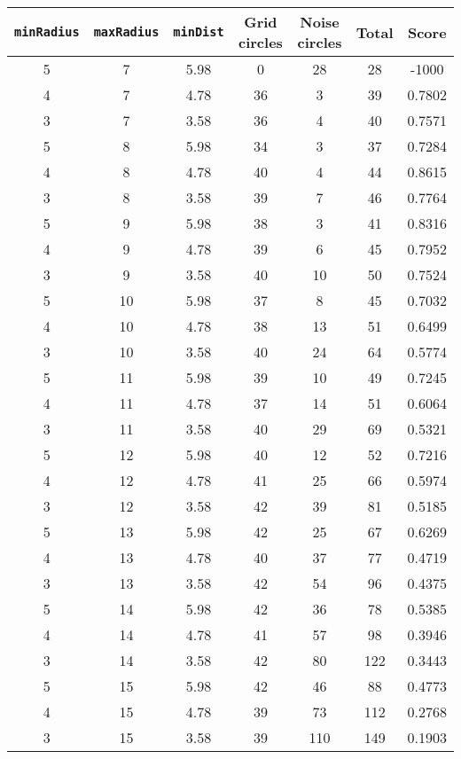 \documentclass[letterpaper, 12pt]{article}
\begin{document}
\begin{longtable}{|c|c|c|c|c|c|c|}
\hline
\textbf{\texttt{minRadius}} & \textbf{\texttt{maxRadius}} & \textbf{\texttt{minDist}} & \textbf{Grid circles} & \textbf{Noise circles} & \textbf{Total} & \textbf{Score} \\
\hline
5 & 7 & 5.98 & 0 & 28 & 28 & -1000 \\
\hline
4 & 7 & 4.78 & 36 & 3 & 39 & 0.7802 \\
\hline
3 & 7 & 3.58 & 36 & 4 & 40 & 0.7571 \\
\hline
5 & 8 & 5.98 & 34 & 3 & 37 & 0.7284 \\
\hline
4 & 8 & 4.78 & 40 & 4 & 44 & 0.8615 \\
\hline
3 & 8 & 3.58 & 39 & 7 & 46 & 0.7764 \\
\hline
5 & 9 & 5.98 & 38 & 3 & 41 & 0.8316 \\
\hline
4 & 9 & 4.78 & 39 & 6 & 45 & 0.7952 \\
\hline
3 & 9 & 3.58 & 40 & 10 & 50 & 0.7524 \\
\hline
5 & 10 & 5.98 & 37 & 8 & 45 & 0.7032 \\
\hline
4 & 10 & 4.78 & 38 & 13 & 51 & 0.6499 \\
\hline
3 & 10 & 3.58 & 40 & 24 & 64 & 0.5774 \\
\hline
5 & 11 & 5.98 & 39 & 10 & 49 & 0.7245 \\
\hline
4 & 11 & 4.78 & 37 & 14 & 51 & 0.6064 \\
\hline
3 & 11 & 3.58 & 40 & 29 & 69 & 0.5321 \\
\hline
5 & 12 & 5.98 & 40 & 12 & 52 & 0.7216 \\
\hline
4 & 12 & 4.78 & 41 & 25 & 66 & 0.5974 \\
\hline
3 & 12 & 3.58 & 42 & 39 & 81 & 0.5185 \\
\hline
5 & 13 & 5.98 & 42 & 25 & 67 & 0.6269 \\
\hline
4 & 13 & 4.78 & 40 & 37 & 77 & 0.4719 \\
\hline
3 & 13 & 3.58 & 42 & 54 & 96 & 0.4375 \\
\hline
5 & 14 & 5.98 & 42 & 36 & 78 & 0.5385 \\
\hline
4 & 14 & 4.78 & 41 & 57 & 98 & 0.3946 \\
\hline
3 & 14 & 3.58 & 42 & 80 & 122 & 0.3443 \\
\hline
5 & 15 & 5.98 & 42 & 46 & 88 & 0.4773 \\
\hline
4 & 15 & 4.78 & 39 & 73 & 112 & 0.2768 \\
\hline
3 & 15 & 3.58 & 39 & 110 & 149 & 0.1903 \\

\end{longtable}
\end{document}
